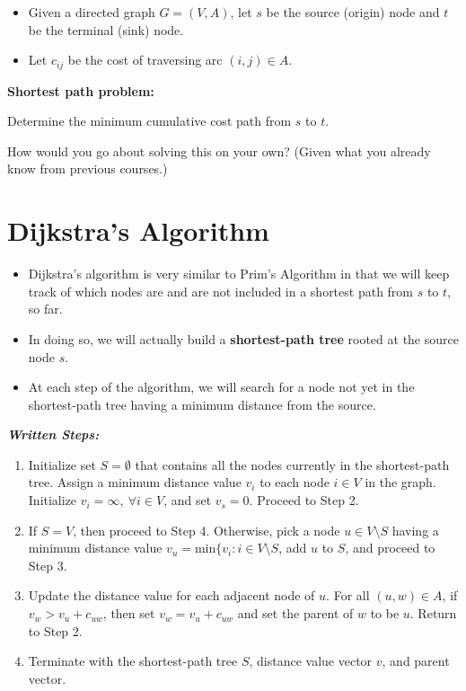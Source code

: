 \documentclass[12pt]{article}
\theoremstyle{definition}
\begin{document}
\begin{itemize}
\item Given a directed graph $G=(V,A)$, let $s$ be the source (origin) node and $t$ be the terminal (sink) node. 
\item Let $c_{ij}$ be the cost of traversing arc $(i,j) \in A$.
\end{itemize}

\textbf{Shortest path problem:} 

Determine the minimum cumulative cost path from $s$ to $t$.


How would you go about solving this on your own? (Given what you already know from previous courses.)

\vfill

\newpage
\section{Dijkstra's Algorithm}

\begin{itemize}
	\item Dijkstra's algorithm is very similar to Prim's Algorithm in that we will keep track of which nodes are and are not included in a shortest path from $s$ to $t$, so far.  
	\item In doing so, we will actually build a \textbf{shortest-path tree} rooted at the source node $s$.
	\item At each step of the algorithm, we will search for a node not yet in the shortest-path tree having a minimum distance from the source.
\end{itemize}




\emph{\textbf{Written Steps:}}
\begin{enumerate}
	\item Initialize set $S = \emptyset$ that contains all the nodes currently in the shortest-path tree. Assign a minimum distance value $v_i$ to each node $i \in V$ in the graph. Initialize $v_i = \infty, \ \forall i \in V$, and set $v_s = 0$.  Proceed to Step 2.
	\item If $S = V$, then proceed to Step 4. Otherwise, pick a node $u \in V \setminus S$ having a minimum distance value $v_u = \textrm{min} \{v_i: i \in V\setminus S$, add $u$ to $S$, and proceed to Step 3.
	\item Update the distance value for each adjacent node of $u$. For all $(u,w) \in A$, if $v_w > v_u + c_{uw}$, then set $v_w = v_u + c_{uw}$ and set the parent of $w$ to be $u$. Return to Step 2. 
	\item Terminate with the shortest-path tree $S$, distance value vector $v$, and parent vector. 
\end{enumerate}
\end{document}
